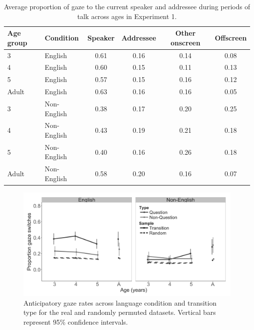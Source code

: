 \documentclass[authoryear, 12pt]{elsarticle}
\begin{document}
\linespread{1}
\begin{table}[t]
\begin{center}
  \begin{tabular}{llcccc}
    \hline
    Age group & Condition & Speaker & Addressee & Other onscreen & Offscreen\\ 
    \hline
    3 & English & 0.61 & 0.16 & 0.14 & 0.08 \\ 
    4 & English & 0.60 & 0.15 & 0.11 & 0.13 \\ 
    5 & English & 0.57 & 0.15 & 0.16 & 0.12 \\ 
    Adult & English & 0.63 & 0.16 & 0.16 & 0.05 \\ 
    3 & Non-English & 0.38 & 0.17 & 0.20 & 0.25 \\ 
    4 & Non-English & 0.43 & 0.19 & 0.21 & 0.18 \\ 
    5 & Non-English & 0.40 & 0.16 & 0.26 & 0.18 \\ 
    Adult & Non-English & 0.58 & 0.20 & 0.16 & 0.07 \\ 
    \hline
  \end{tabular}
\end{center}
  \caption{Average proportion of gaze to the current speaker and addressee during periods of talk across ages in Experiment 1.}
\label{tab:e1_look}
\end{table}

\begin{figure}[h]
\begin{center}
\includegraphics[width=1\textwidth]{figures/E1-samples-by-lang-groups-trans-types.png}
\end{center}
\caption{Anticipatory gaze rates across language condition and transition type for the real and randomly permuted datasets. Vertical bars represent 95\% confidence intervals.} 
\label{fig:E1-randvsreal}
\end{figure}
\end{document}
